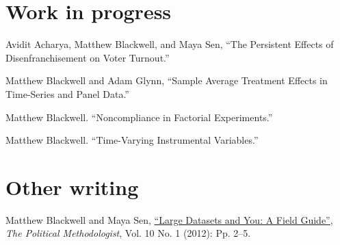 \documentclass[margin,line,12pt]{res}
\begin{document}
\begin{resume}
\section{\sc Work in progress}

Avidit Acharya, Matthew Blackwell, and Maya Sen, ``The Persistent Effects of Disenfranchisement on Voter Turnout.''


Matthew Blackwell and Adam Glynn, ``Sample Average Treatment Effects in Time-Series and Panel Data.'' 

Matthew Blackwell. ``Noncompliance in Factorial Experiments.'' 

Matthew Blackwell. ``Time-Varying Instrumental Variables.'' 


\section{\sc Other writing}

Matthew Blackwell and Maya Sen, 
\href{http://polmeth.wustl.edu/methodologist/tpm_v20_n1.pdf}{``Large
  Datasets and You: A Field Guide''}, \emph{The Political
  Methodologist}, Vol. 10 No. 1 (2012): Pp. 2--5.


\end{resume}
\end{document}
